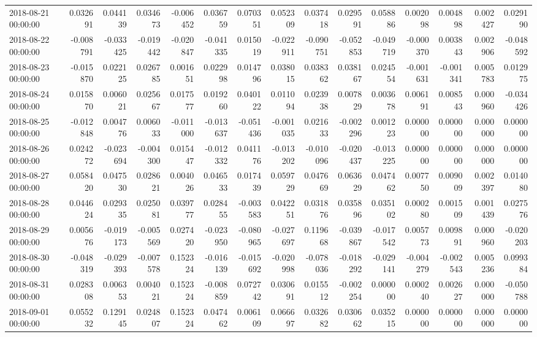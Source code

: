 \begin{tabular}{lrrrrrrrrrrrrrr}
2018-08-21 00:00:00 & 0.032691 & 0.044139 & 0.034673 & -0.006452 & 0.036759 & 0.070351 & 0.052309 & 0.037418 & 0.029591 & 0.058886 & 0.002098 & 0.004898 & 0.002427 & 0.029190 \\
2018-08-22 00:00:00 & -0.008791 & -0.033425 & -0.019442 & -0.020847 & -0.041335 & 0.015019 & -0.022911 & -0.090751 & -0.052853 & -0.049719 & -0.000370 & 0.003843 & 0.002906 & -0.048592 \\
2018-08-23 00:00:00 & -0.015870 & 0.022125 & 0.026785 & 0.001651 & 0.022998 & 0.014796 & 0.038015 & 0.038362 & 0.038167 & 0.024554 & -0.001631 & -0.001341 & 0.005783 & 0.012975 \\
2018-08-24 00:00:00 & 0.015870 & 0.006021 & 0.025667 & 0.017577 & 0.019260 & 0.040122 & 0.011094 & 0.023938 & 0.007829 & 0.003678 & 0.006191 & 0.008543 & 0.000960 & -0.034426 \\
2018-08-25 00:00:00 & -0.012848 & 0.004776 & 0.006033 & -0.011000 & -0.013637 & -0.051436 & -0.001035 & 0.021633 & -0.002296 & 0.001223 & 0.000000 & 0.000000 & 0.000000 & 0.000000 \\
2018-08-26 00:00:00 & 0.024272 & -0.023694 & -0.004300 & 0.015447 & -0.012332 & 0.041176 & -0.013202 & -0.010096 & -0.020437 & -0.013225 & 0.000000 & 0.000000 & 0.000000 & 0.000000 \\
2018-08-27 00:00:00 & 0.058420 & 0.047530 & 0.028621 & 0.004026 & 0.046533 & 0.017439 & 0.059729 & 0.047669 & 0.063629 & 0.047462 & 0.007750 & 0.009009 & 0.002397 & 0.014080 \\
2018-08-28 00:00:00 & 0.044624 & 0.029335 & 0.025081 & 0.039777 & 0.028455 & -0.003583 & 0.042251 & 0.031876 & 0.035896 & 0.035102 & 0.000280 & 0.001509 & 0.001439 & 0.027576 \\
2018-08-29 00:00:00 & 0.005676 & -0.019173 & -0.005569 & 0.027420 & -0.023950 & -0.080965 & -0.027697 & 0.119668 & -0.039867 & -0.017542 & 0.005773 & 0.009891 & 0.000960 & -0.020203 \\
2018-08-30 00:00:00 & -0.048319 & -0.029393 & -0.007578 & 0.152324 & -0.016139 & -0.015692 & -0.020998 & -0.078036 & -0.018292 & -0.029141 & -0.004279 & -0.002543 & 0.005236 & 0.099384 \\
2018-08-31 00:00:00 & 0.028308 & 0.006353 & 0.004021 & 0.152324 & -0.008859 & 0.072742 & 0.030691 & 0.015512 & -0.002254 & 0.000000 & 0.000240 & 0.002627 & 0.000000 & -0.050788 \\
2018-09-01 00:00:00 & 0.055232 & 0.129145 & 0.024807 & 0.152324 & 0.047462 & 0.006109 & 0.066697 & 0.032682 & 0.030662 & 0.035215 & 0.000000 & 0.000000 & 0.000000 & 0.000000 \\

\end{tabular}
